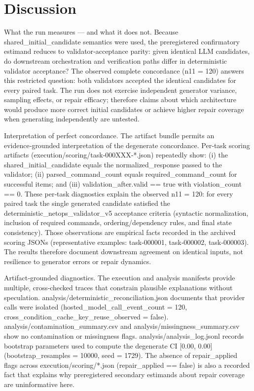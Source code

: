 \documentclass[conference]{IEEEtran}
\begin{document}
\section{Discussion}
What the run measures --- and what it does not. Because shared\_initial\_candidate semantics were used, the preregistered confirmatory estimand reduces to validator‑acceptance parity: given identical LLM candidates, do downstream orchestration and verification paths differ in deterministic validator acceptance? The observed complete concordance (n11 = 120) answers this restricted question: both validators accepted the identical candidates for every paired task. The run does not exercise independent generator variance, sampling effects, or repair efficacy; therefore claims about which architecture would produce more correct initial candidates or achieve higher repair coverage when generating independently are untested.

Interpretation of perfect concordance. The artifact bundle permits an evidence‑grounded interpretation of the degenerate concordance. Per‑task scoring artifacts (execution/scoring/task‑000XXX‑*.json) repeatedly show: (i) the shared\_initial\_candidate equals the normalized\_response passed to the validator; (ii) parsed\_command\_count equals required\_command\_count for successful items; and (iii) validation\_after.valid == true with violation\_count == 0. These per‑task diagnostics explain the observed n11 = 120: for every paired task the single generated candidate satisfied the deterministic\_netops\_validator\_v5 acceptance criteria (syntactic normalization, inclusion of required commands, ordering/dependency rules, and final state consistency). Those observations are empirical facts recorded in the archived scoring JSONs (representative examples: task‑000001, task‑000002, task‑000003). The results therefore document downstream agreement on identical inputs, not resilience to generator errors or repair dynamics.

Artifact‑grounded diagnostics. The execution and analysis manifests provide multiple, cross‑checked traces that constrain plausible explanations without speculation. analysis/deterministic\_reconciliation.json documents that provider calls were isolated (hosted\_model\_call\_event\_count = 120, cross\_condition\_cache\_key\_reuse\_observed = false). analysis/contamination\_summary.csv and analysis/missingness\_summary.csv show no contamination or missingness flags. analysis/analysis\_log.jsonl records bootstrap parameters used to compute the degenerate CI [0.00, 0.00] (bootstrap\_resamples = 10000, seed = 1729). The absence of repair\_applied flags across execution/scoring/*.json (repair\_applied == false) is also a recorded fact that explains why preregistered secondary estimands about repair coverage are uninformative here.
\end{document}
